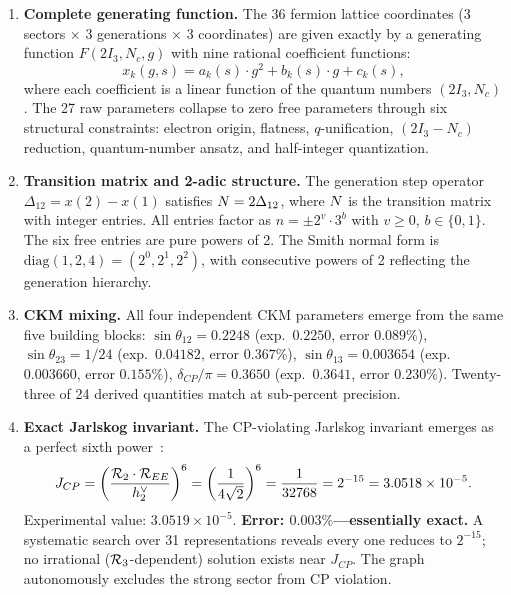\begin{enumerate}[label=\arabic*.]
\item \textbf{Complete generating function.} The 36 fermion lattice coordinates (3 sectors $\times$ 3 generations $\times$ 3 coordinates) are given exactly by a generating function $F(2I_3, N_c, g)$ with nine rational coefficient functions:
\begin{equation}
x_k(g, s) = a_k(s) \cdot g^2 + b_k(s) \cdot g + c_k(s),
\end{equation}
where each coefficient is a linear function of the quantum numbers $(2I_3, N_c)$. The 27 raw parameters collapse to zero free parameters through six structural constraints: electron origin, flatness, $q$-unification, $(2I_3 - N_c)$ reduction, quantum-number ansatz, and half-integer quantization.

\item \textbf{Transition matrix and 2-adic structure.} The generation step operator $\Delta_{12} = x(2) - x(1)$ satisfies $N = 2\Delta_{12}$, where $N$ is the transition matrix with integer entries. All entries factor as $n = \pm 2^v \cdot 3^b$ with $v \geq 0$, $b \in \{0, 1\}$. The six free entries are pure powers of 2. The Smith normal form is $\mathrm{diag}(1, 2, 4) = (2^0, 2^1, 2^2)$, with consecutive powers of 2 reflecting the generation hierarchy.

\item \textbf{CKM mixing.} All four independent CKM parameters emerge from the same five building blocks: $\sin\theta_{12} = 0.2248$ (exp.\ $0.2250$, error $0.089\%$), $\sin\theta_{23} = 1/24$ (exp.\ $0.04182$, error $0.367\%$), $\sin\theta_{13} = 0.003654$ (exp.\ $0.003660$, error $0.155\%$), $\delta_{CP}/\pi = 0.3650$ (exp.\ $0.3641$, error $0.230\%$). Twenty-three of 24 derived quantities match at sub-percent precision.

\item \textbf{Exact Jarlskog invariant.} The CP-violating Jarlskog invariant emerges as a perfect sixth power~\cite{jarlskog1985}:
\begin{equation}
J_{CP} = \left(\frac{\mathcal{R}_2 \cdot \mathcal{R}_{EE}}{h^\vee_2}\right)^6 = \left(\frac{1}{4\sqrt{2}}\right)^6 = \frac{1}{32768} = 2^{-15} = 3.0518 \times 10^{-5}.
\end{equation}
Experimental value: $3.0519 \times 10^{-5}$. \textbf{Error: $0.003\%$---essentially exact.} A systematic search over 31 representations reveals every one reduces to $2^{-15}$; no irrational ($\mathcal{R}_3$-dependent) solution exists near $J_{CP}$. The graph autonomously excludes the strong sector from CP violation.


\end{enumerate}
